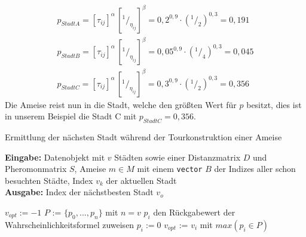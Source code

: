 \documentclass[doktyp=barbeit, sprache=german]{TUBAFarbeiten}
\newcommand*\rfrac[2]{{}^{#1}\!/_{#2}}
\begin{document}
\begin{align}
\label{examplePheromone}
p_{Stadt A} = [\tau_{ij}]^\alpha \, [\rfrac{1}{\eta_{ij}}]^\beta = 0,2^{0,9} \cdot (\rfrac{1}{2})^{0,3} = 0,191 \nonumber
\\p_{Stadt B} = [\tau_{ij}]^\alpha \, [\rfrac{1}{\eta_{ij}}]^\beta = 0,05^{0,9} \cdot (\rfrac{1}{4})^{0,3} = 0,045 \nonumber
\\p_{Stadt C} = [\tau_{ij}]^\alpha \, [\rfrac{1}{\eta_{ij}}]^\beta = 0,3^{0,9} \cdot (\rfrac{1}{2})^{0,3} = 0,356 \nonumber
\end{align}
Die Ameise reist nun in die Stadt, welche den größten Wert für $p$ besitzt, dies ist in unserem Beispiel die Stadt C mit $p_{Stadt C} = 0,356$.
\begin{algorithm}
\caption{Ermittlung der nächsten Stadt während der Tourkonstruktion einer Ameise}
\label{probabilityAlg}
\textbf{Eingabe:} Datenobjekt mit $v$ Städten sowie einer Distanzmatrix $D$ und Pheromonmatrix $S$, Ameise $m \in M$ mit einem \texttt{vector} $B$ der Indizes aller schon besuchten Städte, Index $v_k$ der aktuellen Stadt
\\\textbf{Ausgabe:} Index der nächstbesten Stadt $v_o$
\begin{algorithmic}[1]
\State $v_{opt} := -1$
\State $P$ := $\{p_0, ..., p_n\}$ mit $n = v$ 
\State $p_i$ den Rückgabewert der Wahrscheinlichkeitsformel zuweisen
\Else 
\State $p_i := 0$
\EndIf
\EndFor
\State $v_{opt}$ := $v_i$ mit $max(p_i \in P)$
\end{algorithmic}
\end{algorithm}
\end{document}
